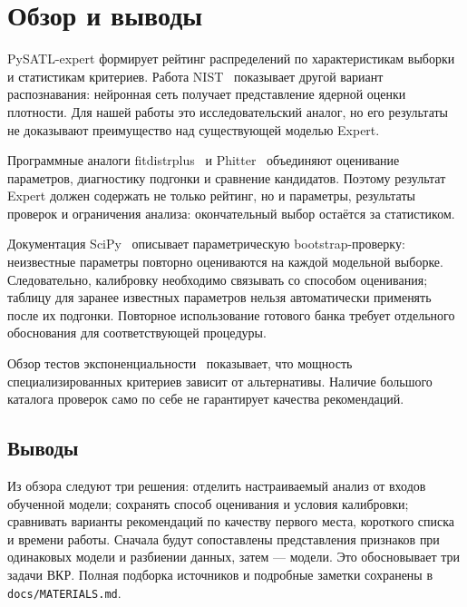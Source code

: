 \section{Обзор и выводы}
\label{sec:relatedworks}

PySATL-expert формирует рейтинг распределений по характеристикам выборки
и статистикам критериев. Работа NIST~\cite{nistDistributionNN} показывает
другой вариант распознавания: нейронная сеть получает представление
ядерной оценки плотности. Для нашей работы это исследовательский аналог,
но его результаты не доказывают преимущество над существующей моделью Expert.

Программные аналоги fitdistrplus~\cite{fitdistrplusOverview}
и Phitter~\cite{phitter2025} объединяют оценивание параметров,
диагностику подгонки и сравнение кандидатов. Поэтому результат Expert
должен содержать не только рейтинг, но и параметры, результаты проверок
и ограничения анализа: окончательный выбор остаётся за статистиком.

Документация SciPy~\cite{scipyGof} описывает параметрическую bootstrap-проверку:
неизвестные параметры повторно оцениваются на каждой модельной выборке.
Следовательно, калибровку необходимо связывать со способом оценивания;
таблицу для заранее известных параметров нельзя автоматически применять
после их подгонки. Повторное использование готового банка требует
отдельного обоснования для соответствующей процедуры.

Обзор тестов экспоненциальности~\cite{exponentialityReview} показывает,
что мощность специализированных критериев зависит от альтернативы.
Наличие большого каталога проверок само по себе не гарантирует
качества рекомендаций.

\subsection*{Выводы}
\label{subsec:review-conclusions}
Из обзора следуют три решения: отделить настраиваемый анализ от входов
обученной модели; сохранять способ оценивания и условия калибровки;
сравнивать варианты рекомендаций по качеству первого места, короткого
списка и времени работы. Сначала будут сопоставлены представления
признаков при одинаковых модели и разбиении данных, затем --- модели.
Это обосновывает три задачи ВКР. Полная подборка источников и подробные
заметки сохранены в \texttt{docs/MATERIALS.md}.
